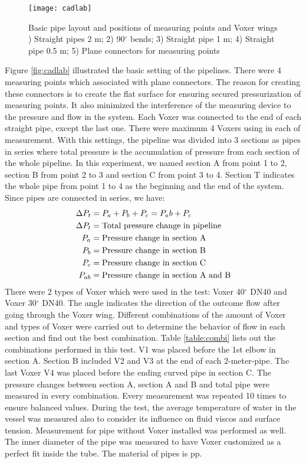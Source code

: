 \begin{figure}[h]
  \centering
  \texttt{[image: cadlab]}
  \caption{ Basic pipe layout and positions of measuring points and Voxer wings ) Straight pipes 2 m; 2) 90$^{\circ}$ bends; 3) Straight pipe 1 m; 4) Straight pipe 0.5 m; 5) Plane connectors for measuring points}
  \label{fig:cadlab}
\end{figure}

Figure \vref{fig:cadlab} illustrated the basic setting of the pipelines. There were 4 measuring points which associated with plane connectors. The reason for creating these connectors is to create the flat surface for ensuring secured pressurization of measuring points. It also minimized the interference of the measuring device to the pressure and flow in the system. Each Voxer was connected to the end of each straight pipe, except the last one. There were maximum 4 Voxers using in each of measurement. With this settings, the pipeline was divided into 3 sections as pipes in series where total pressure is the accumulation of pressure from each section of the whole pipeline. In this experiment, we named section A from point 1 to 2, section B from point 2 to 3 and section C from point 3 to 4. Section T indicates the whole pipe from point 1 to 4 as the beginning and the end of the system. 
Since pipes are connected in series, we have:
\begin{align}
\Delta P_t&= P_a + P_b + P_c = P_ab + P_c \\
\Delta P_t&= \textnormal{Total pressure change in pipeline} \\
P_a&= \textnormal{Pressure change in section A} \\
P_b&= \textnormal{Pressure change in section B} \\
P_c&= \textnormal{Pressure change in section C} \\
P_{ab}&= \textnormal{Pressure change in section A and B} \\
\end{align}
There were 2 types of Voxer which were used in the test: Voxer 40$^{\circ}$ DN40 and Voxer 30$^{\circ}$ DN40. The angle indicates the direction of the outcome flow after going through the Voxer wing. Different combinations of the amount of Voxer and types of Voxer were carried out to determine the behavior of flow in each section and find out the best combination. 
Table \ref{table:combi} lists out the combinations performed in this test. V1 was placed before the 1st elbow in section A. Section B included V2 and V3 at the end of each 2-meter-pipe. The last Voxer V4 was placed before the ending curved pipe in section C. The pressure changes between section A, section A and B and total pipe were measured in every combination. Every measurement was repeated 10 times to ensure balanced values. During the test, the average temperature of water in the vessel was measured also to consider its influence on fluid \gls{viscos} and surface tension. Measurement for pipe without Voxer installed was performed as well. The inner diameter of the pipe was measured to have Voxer customized as a perfect fit inside the tube. The material of pipes is \gls{pp}. 

